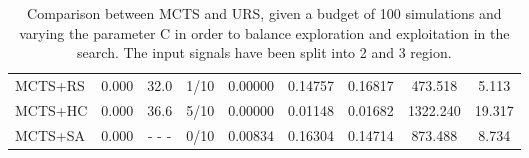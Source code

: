 \documentclass[11pt]{article}
\begin{document}
\begin{table}[ht]
\begin{tabular}{|l|l|c|c|c|c|c|c|c|}
MCTS+RS                                     & 0.000              &  32.0                   & 1/10                          & 0.00000  & 0.14757  & 0.16817  &  473.518   &  5.113       \\
MCTS+HC                                     & 0.000              &  36.6                   & 5/10                          & 0.00000  & 0.01148  & 0.01682  & 1322.240   & 19.317       \\
MCTS+SA                                     & 0.000              & - - -                   & 0/10                          & 0.00834  & 0.16304  & 0.14714  &  873.488   &  8.734       \\ \hline
\end{tabular}
\caption{Comparison between MCTS and URS, given a budget of 100 simulations and varying the parameter C in order to balance exploration and exploitation in the search. The input signals have been split into 2 and 3 region.}~\label{table:res:s2}
\end{table}
\end{document}
